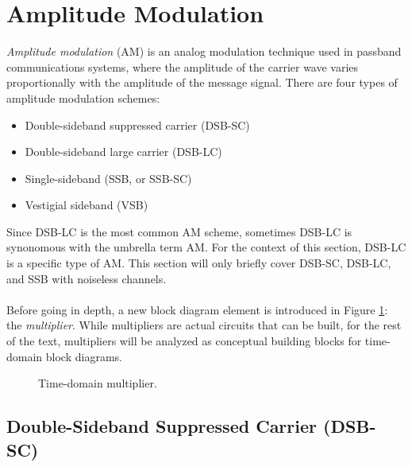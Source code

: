 \documentclass{report}
\begin{document}
\section{Amplitude Modulation}
\emph{Amplitude modulation} (AM) is an analog modulation technique used in passband communications systems, where the amplitude of the carrier wave varies proportionally with the amplitude 
of the message signal. There are four types of amplitude modulation schemes:
\begin{itemize}
    \item Double-sideband suppressed carrier (DSB-SC)
    \item Double-sideband large carrier (DSB-LC)
    \item Single-sideband (SSB, or SSB-SC)
    \item Vestigial sideband (VSB)
\end{itemize}
Since DSB-LC is the most common AM scheme, sometimes DSB-LC is synonomous with the umbrella term AM. For the context of this section, DSB-LC is a specific type of AM. This section will only briefly cover DSB-SC, DSB-LC, and SSB with noiseless channels.
\\ \\
Before going in depth, a new block diagram element is introduced in Figure \ref{multiplier}: the \emph{multiplier}. While multipliers are actual circuits that can be built, for the rest of the text, multipliers will be 
analyzed as conceptual building blocks for time-domain block diagrams.
\begin{figure}[!hbt]
    \centering
    \caption{Time-domain multiplier.}
    \label{multiplier}
\end{figure}

\subsection{Double-Sideband Suppressed Carrier (DSB-SC)}
\end{document}
